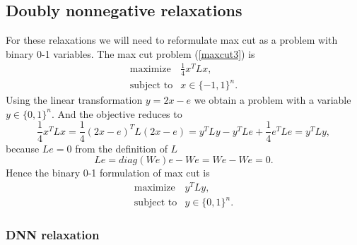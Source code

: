 \documentclass[12pt]{book}
\theoremstyle{definition}
\begin{document}

\subsection{Doubly nonnegative relaxations}
For these relaxations we will need to reformulate max cut as a problem with binary 0-1 variables. The max cut problem 
(\ref{maxcut3}) is 
\begin{equation}
\begin{array}{ll}
\mbox{maximize} & \frac{1}{4}x^TLx, \\
\mbox{subject to} & x\in\{-1,1\}^n .
\end{array}	
\end{equation}
Using the linear transformation $y = 2x - e$ we obtain a problem with a 	
variable $y\in \{0,1\}^n.$ And the objective reduces to 
$$\frac{1}{4}x^TLx = \frac{1}{4}(2x-e)^TL(2x-e) = y^TLy - y^TLe + \frac{1}{4}e^TLe = y^TLy,$$
because $Le = 0$ from the definition of $L$ 
$$Le = diag(We)e - We = We - We = 0.$$
Hence the binary 0-1 formulation of max cut is 
\begin{equation}
\label{MaxCut0-1}
\begin{array}{ll}
\mbox{maximize} & y^TLy, \\
\mbox{subject to} & y\in\{0,1\}^n .
\end{array}	
\end{equation}



\subsubsection{DNN relaxation}
\end{document}
